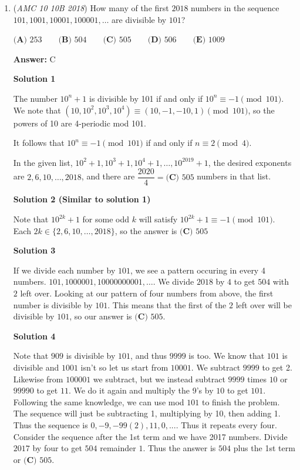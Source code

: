 \begin{enumerate}
 


	\item (\textit{AMC 10 10B 2018}) How many of the first $2018$ numbers in the sequence $101, 1001, 10001, 100001, \dots$ are divisible by $101$?


 $\textbf{(A) }253 \qquad \textbf{(B) }504 \qquad \textbf{(C) }505 \qquad \textbf{(D) }506 \qquad \textbf{(E) }1009 \qquad$

 \textbf{Answer: }C



\textbf{Solution 1}

The number $10^n+1$ is divisible by 101 if and only if $10^n\equiv -1\pmod{101}$. We note that $(10,10^2,10^3,10^4)\equiv (10,-1,-10,1)\pmod{101}$, so the powers of 10 are 4-periodic mod 101.

 It follows that $10^n\equiv -1\pmod{101}$ if and only if $n\equiv 2\pmod 4$.

 In the given list, $10^2+1,10^3+1,10^4+1,\dots,10^{2019}+1$, the desired exponents are $2,6,10,\dots,2018$, and there are $\dfrac{2020}{4}=\boxed{\textbf{(C) } 505}$ numbers in that list.


 



\textbf{Solution 2 (Similar to solution 1)}

Note that $10^{2k}+1$ for some odd $k$ will satisfy $10^{2k}+1 \equiv -1\pmod {101}$. Each $2k \in \{2,6,10,\dots,2018\}$, so the answer is $\boxed{\textbf{(C) } 505}$




\textbf{Solution 3}

If we divide each number by $101$, we see a pattern occuring in every 4 numbers. $101, 1000001, 10000000001, \dots$. We divide $2018$ by $4$ to get $504$ with $2$ left over. Looking at our pattern of four numbers from above, the first number is divisible by $101$. This means that the first of the $2$ left over will be divisible by $101$, so our answer is $\boxed{\textbf{(C) } 505}$.

 



\textbf{Solution 4}

Note that $909$ is divisible by $101$, and thus $9999$ is too. We know that $101$ is divisible and $1001$ isn't so let us start from $10001$. We subtract $9999$ to get 2. Likewise from $100001$ we subtract, but we instead subtract $9999$ times $10$ or $99990$ to get $11$. We do it again and multiply the 9's by $10$ to get $101$. Following the same knowledge, we can use mod $101$ to finish the problem. The sequence will just be subtracting 1, multiplying by 10, then adding 1. Thus the sequence is ${0,-9,-99 ( 2),11, 0, ...}$. Thus it repeats every four. Consider the sequence after the 1st term and we have 2017 numbers. Divide $2017$ by four to get $504$ remainder $1$. Thus the answer is $504$ plus the 1st term or $\boxed{\textbf{(C) } 505}$.


\end{enumerate}
